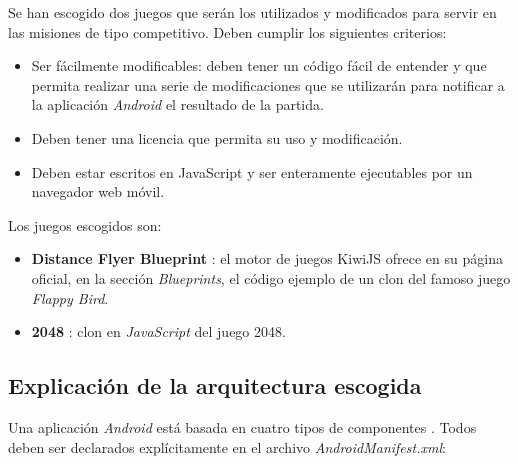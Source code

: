 \documentclass[twoside]{report}
\begin{document}
Se han escogido dos juegos que serán los utilizados y modificados para servir en las misiones de tipo competitivo. Deben cumplir los siguientes criterios:

\begin{itemize}
\item Ser fácilmente modificables: deben tener un código fácil de entender y que permita realizar una serie de modificaciones que se utilizarán para notificar a la aplicación \textit{Android} el resultado de la partida.

\item Deben tener una licencia que permita su uso y modificación.

\item Deben estar escritos en JavaScript y ser enteramente ejecutables por un navegador web móvil.
\end{itemize}

Los juegos escogidos son:

\begin{itemize}
\item \textbf{Distance Flyer Blueprint} \cite{distancegame}: el motor de juegos KiwiJS ofrece en su página oficial, en la sección \textit{Blueprints}, el código ejemplo de un clon del famoso juego \textit{Flappy Bird}.

\item \textbf{2048} \cite{2048game}: clon en \textit{JavaScript} del juego 2048.
\end{itemize}

\subsection{Explicación de la arquitectura escogida}

Una aplicación \textit{Android} está basada en cuatro tipos de componentes \cite{androidfund} \cite{androidpacktpub}. Todos deben ser declarados explícitamente en el archivo \textit{AndroidManifest.xml}:
\end{document}
